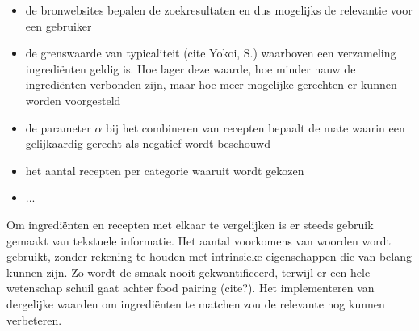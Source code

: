 \documentclass{hogent-article}
\begin{document}
\begin{itemize}
    \item de bronwebsites bepalen de zoekresultaten en dus mogelijks de relevantie voor een gebruiker
    \item de grenswaarde van typicaliteit (cite Yokoi, S.) waarboven een verzameling ingrediënten geldig is. Hoe lager deze waarde, hoe minder nauw de ingrediënten verbonden zijn, maar hoe meer mogelijke gerechten er kunnen worden voorgesteld
    \item de parameter $\alpha$ bij het combineren van recepten bepaalt de mate waarin een gelijkaardig gerecht als negatief wordt beschouwd
    \item het aantal recepten per categorie waaruit wordt gekozen
    \item ...
\end{itemize}

Om ingrediënten en recepten met elkaar te vergelijken is er steeds gebruik gemaakt van tekstuele informatie. Het aantal voorkomens van woorden wordt gebruikt, zonder rekening te houden met intrinsieke eigenschappen die van belang kunnen zijn. Zo wordt de smaak nooit gekwantificeerd, terwijl er een hele wetenschap schuil gaat achter food pairing (cite?). Het implementeren van dergelijke waarden om ingrediënten te matchen zou de relevante nog kunnen verbeteren. 



\end{document}

